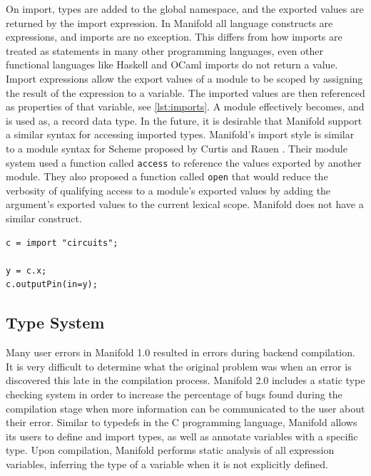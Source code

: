 On import, types are added to the global namespace, and the exported values are returned by the import
expression. In Manifold all language constructs are
expressions, and imports are no exception. This differs from how imports are
treated as statements in many other
programming languages, even other functional languages like Haskell and
OCaml imports do not return a value.  Import expressions allow the
export values of a module to be scoped by assigning the result of the expression
to a variable. The imported values are then referenced as properties of that
variable, see \autoref{lst:imports}. A module effectively becomes, and is used as,
a record data type. In the future, it is desirable that Manifold support a
similar syntax for accessing imported types.
Manifold's import style is similar to a module syntax for Scheme proposed by
Curtis and Rauen \cite{Curtis:1990:MSS:91556.91573}. Their module system used
a function called \texttt{access} to reference the values exported by another
module. They also proposed a function called \texttt{open} that would reduce
the verbosity of qualifying access to a module's exported values by adding the
argument's exported values to the current lexical scope. Manifold does not
have a similar construct.

\begin{lstlisting}[label=lst:imports, caption=A module imported into a Manifold file]
c = import "circuits";

y = c.x;
c.outputPin(in=y);
\end{lstlisting}

\subsection{Type System}

Many user errors in Manifold 1.0 resulted in errors during backend compilation. It is very difficult
to determine what the original problem was when an error is discovered this late in the compilation
process. Manifold 2.0 includes a static type checking system in order to increase the percentage of bugs found during
the compilation stage when more information can be communicated to the user about their error.
Similar to typedefs in the C programming language, Manifold allows its users to define and import types,
as well as annotate variables with a specific type. Upon compilation,
Manifold performs static analysis of all expression variables, inferring the type of a variable when it
is not explicitly defined.

